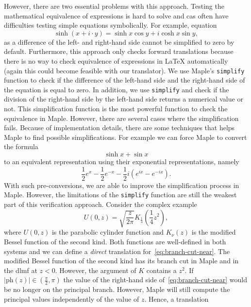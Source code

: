 \documentclass[a4paper,11pt]{article}
\newcommand{\Maple}{Maple}
\theoremstyle{defTheoStyle}
\theoremstyle{defExampStyle}
\DeclareRobustCommand{\cpi}{{\pi}}
\DeclareRobustCommand{\expe}{{e}}
\DeclareRobustCommand{\iunit}{{i}}
\newcommand{\ph}[1]{\mathrm{ph}\!\left(#1\right)}
\begin{document}
However, there are two essential problems with this approach. Testing the mathematical equivalence of expressions is hard to solve and \gls*{cas} often have difficulties testing simple equations symbolically. For example, equation~\parencite[(4.35.34)]{NIST:DLMF}
\begin{equation*}
\sinh \left( x+\iunit \cdot y \right) = \sinh x \cos y + \iunit \cosh x \sin y,
\end{equation*}
as a difference of the left- and right-hand side cannot be simplified to zero by default. Furthermore, this approach only checks forward translations because there is no way to check equivalence of expressions in \LaTeX{} automatically (again this could become feasible with our translator). We use \Maple's \texttt{simplify} function to check if the difference of the left-hand side and the right-hand side of the equation is equal to zero. In addition, we use \texttt{simplify} and check if the division of the right-hand side by the left-hand side returns a numerical value or not. This simplification function is the most powerful function to check the equivalence in \Maple. However, there are several cases where the simplification fails. Because of implementation details, there are some techniques that helps \Maple{} to find possible simplifications. For example we can force \Maple{} to convert the formula
\begin{equation}
\sinh{x} + \sin{x}
\end{equation}
to an equivalent representation using their exponential representations, namely
\begin{equation}
\frac{1}{2}\expe^x - \frac{1}{2}\expe^{-x} - \frac{1}{2} \iunit \left( \expe^{\iunit x}-\expe^{-\iunit x} \right).
\end{equation}
With such pre-conversions, we are able to improve the simplification process in \Maple. However, the limitations of the \texttt{simplify} function are still the weakest part of this verification approach. Consider the complex example~\parencite[(12.7.10)]{NIST:DLMF}
\begin{equation}\label{eq:branch-cut-near}
\displaystyle U(0,z) = \sqrt{\frac{z}{2\cpi}} K_{\frac{1}{4}}\left(\frac{1}{4}z^2\right),
\end{equation}
where $U(0,z)$ is the parabolic cylinder function and $K_\nu(z)$ is the modified Bessel function of the second kind. Both functions are well-defined in both systems and we can define a \textit{direct} translation for~\eqref{eq:branch-cut-near}. 
The modified Bessel function of the second kind has its branch cut in \Maple{} and in the \gls*{dlmf} at $z < 0$. However, the argument of $K$ contains a $z^2$. If $|\ph{z}| \in \left(\frac{\cpi}{2}, \cpi\right)$ the value of the right-hand side of~\eqref{eq:branch-cut-near} would be no longer on the principal branch. However, \Maple{} will still compute the principal values independently of the value of $z$. Hence, a translation
\end{document}
